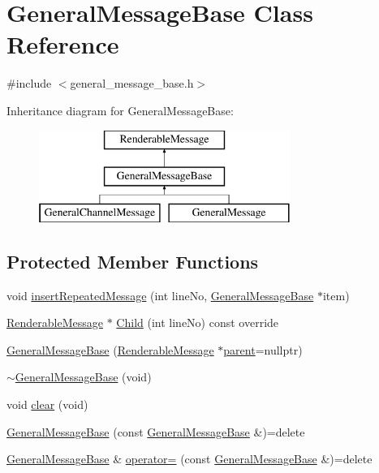\hypertarget{classGeneralMessageBase}{\section{General\-Message\-Base Class Reference}
\label{classGeneralMessageBase}
}


{\ttfamily \#include $<$general\-\_\-message\-\_\-base.\-h$>$}

Inheritance diagram for General\-Message\-Base\-:\begin{figure}[H]
\begin{center}
\leavevmode
\includegraphics[height=3.000000cm]{classGeneralMessageBase}
\end{center}
\end{figure}
\subsection*{Protected Member Functions}
\begin{DoxyCompactItemize}
\item 
void \hyperlink{classGeneralMessageBase_a7b063ed053799b40e65b4fc36d53ffe8}{insert\-Repeated\-Message} (int line\-No, \hyperlink{classGeneralMessageBase}{General\-Message\-Base} $\ast$item)
\item 
\hyperlink{classRenderableMessage}{Renderable\-Message} $\ast$ \hyperlink{classGeneralMessageBase_a9ab394f1176382bbef06e1b7c37e35ee}{Child} (int line\-No) const override
\item 
\hyperlink{classGeneralMessageBase_a94b72a6e3f9cfe7204bd17f589840a77}{General\-Message\-Base} (\hyperlink{classRenderableMessage}{Renderable\-Message} $\ast$\hyperlink{classRenderableMessage_ab23728d14d9aff3efa0af7639ec6059c}{parent}=nullptr)
\item 
\hyperlink{classGeneralMessageBase_ab50f085176c924a1d08a805419499a6d}{$\sim$\-General\-Message\-Base} (void)
\item 
void \hyperlink{classGeneralMessageBase_a30f39896e2bb072ac8f67e46e6c95e41}{clear} (void)
\item 
\hyperlink{classGeneralMessageBase_af9e00565fe280e45a0155f583057ddbd}{General\-Message\-Base} (const \hyperlink{classGeneralMessageBase}{General\-Message\-Base} \&)=delete
\item 
\hyperlink{classGeneralMessageBase}{General\-Message\-Base} \& \hyperlink{classGeneralMessageBase_aa360714a5ea853427bfd7662f8928d8c}{operator=} (const \hyperlink{classGeneralMessageBase}{General\-Message\-Base} \&)=delete
\end{DoxyCompactItemize}
